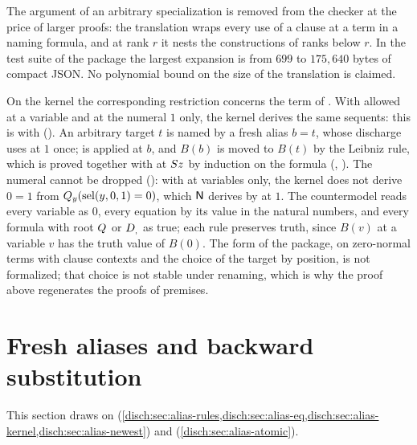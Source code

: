 \begin{remark}
\label{disch:rem:spec-cost}
The argument of an arbitrary specialization is removed from the checker at
the price of larger proofs: the translation wraps every use of a clause at
a term in a naming formula, and at rank $r$ it nests the constructions of
ranks below $r$. In the test suite of the package the largest expansion is
from $699$ to $175{,}640$ bytes of compact JSON. No polynomial bound on the
size of the translation is claimed.
\end{remark}

\begin{remark}
\label{disch:rem:spec-lean}
On the kernel the corresponding restriction concerns the term of
. With  allowed at a variable and at the numeral
$1$ only, the kernel derives the same sequents: this is  with
 (). An arbitrary target $t$
is named by a fresh alias $b=t$, whose discharge uses  at $1$
once;  is applied at $b$, and $B(b)$ is moved to $B(t)$ by
the Leibniz rule, which is proved together with  at
$S z$ by induction on the formula (,
). The numeral cannot be dropped
(): with  at variables only, the
kernel does not derive $0=1$ from $Q_{y}(\operatorname{sel}(y,0,1)=0)$, which $\mathsf{N}$
derives by  at $1$. The countermodel reads every variable as
$0$, every equation by its value in the natural numbers, and every formula
with root $Q_{}$ or $D_{,}$ as true; each rule preserves truth, since
$B(v)$ at a variable $v$ has the truth value of $B(0)$. The form of the
package, on zero-normal terms with clause contexts and the choice of the
target by position, is not formalized; that choice is not stable under
renaming, which is why the proof above regenerates the proofs of premises.
\end{remark}

\section{Fresh aliases and backward substitution}
\label{disch:sec:alias}

This section draws on 
(\cref{disch:sec:alias-rules,disch:sec:alias-eq,disch:sec:alias-kernel,disch:sec:alias-newest})
and  (\cref{disch:sec:alias-atomic}).


